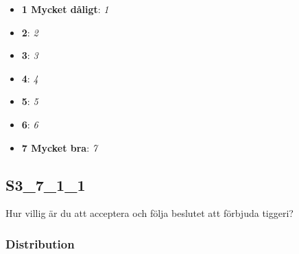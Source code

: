 \documentclass[]{book}
\providecommand{\tightlist}{%
  \setlength{\itemsep}{0pt}\setlength{\parskip}{0pt}}
\begin{document}
\begin{itemize}
\tightlist
\item
  \textbf{1 Mycket dåligt}: \emph{1}
\item
  \textbf{2}: \emph{2}
\item
  \textbf{3}: \emph{3}
\item
  \textbf{4}: \emph{4}
\item
  \textbf{5}: \emph{5}
\item
  \textbf{6}: \emph{6}
\item
  \textbf{7 Mycket bra}: \emph{7}
\end{itemize}

\subsection{S3\_7\_1\_1}\label{S3_7_1_1}

Hur villig är du att acceptera och följa beslutet att förbjuda tiggeri?

\subsubsection{Distribution}\label{S3_7_1_1_distribution}
\end{document}

